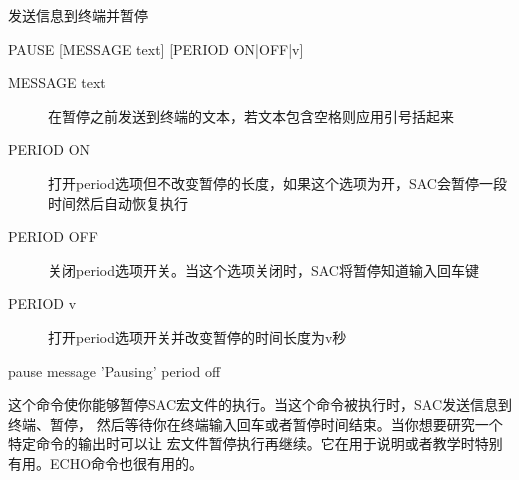 \label{cmd:pause}

发送信息到终端并暂停

\begin{SACSTX}
PAUSE [MESSAGE text] [PERIOD ON|OFF|v]
\end{SACSTX}

\begin{description}
\item [MESSAGE text] 在暂停之前发送到终端的文本，若文本包含空格则应用引号括起来
\item [PERIOD ON] 打开period选项但不改变暂停的长度，如果这个选项为开，SAC会暂停一段时间然后自动恢复执行
\item [PERIOD OFF] 关闭period选项开关。当这个选项关闭时，SAC将暂停知道输入回车键
\item [PERIOD v] 打开period选项开关并改变暂停的时间长度为v秒
\end{description}

\begin{SACDFT}
pause message 'Pausing' period off
\end{SACDFT}

这个命令使你能够暂停SAC宏文件的执行。当这个命令被执行时，SAC发送信息到终端、暂停，
然后等待你在终端输入回车或者暂停时间结束。当你想要研究一个特定命令的输出时可以让
宏文件暂停执行再继续。它在用于说明或者教学时特别有用。ECHO命令也很有用的。

